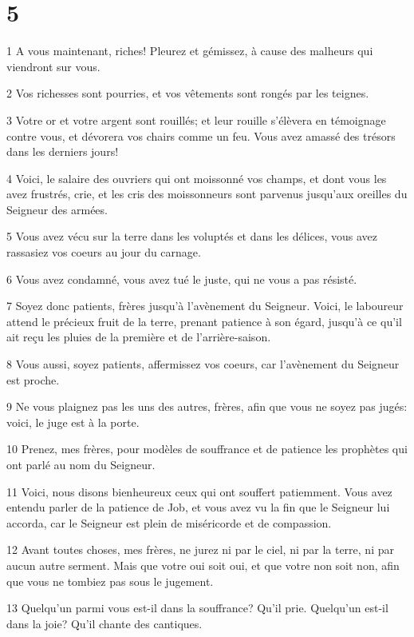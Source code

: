 \chapter{5}

\par 1 A vous maintenant, riches! Pleurez et gémissez, à cause des malheurs qui viendront sur vous.
\par 2 Vos richesses sont pourries, et vos vêtements sont rongés par les teignes.
\par 3 Votre or et votre argent sont rouillés; et leur rouille s'élèvera en témoignage contre vous, et dévorera vos chairs comme un feu. Vous avez amassé des trésors dans les derniers jours!
\par 4 Voici, le salaire des ouvriers qui ont moissonné vos champs, et dont vous les avez frustrés, crie, et les cris des moissonneurs sont parvenus jusqu'aux oreilles du Seigneur des armées.
\par 5 Vous avez vécu sur la terre dans les voluptés et dans les délices, vous avez rassasiez vos coeurs au jour du carnage.
\par 6 Vous avez condamné, vous avez tué le juste, qui ne vous a pas résisté.
\par 7 Soyez donc patients, frères jusqu'à l'avènement du Seigneur. Voici, le laboureur attend le précieux fruit de la terre, prenant patience à son égard, jusqu'à ce qu'il ait reçu les pluies de la première et de l'arrière-saison.
\par 8 Vous aussi, soyez patients, affermissez vos coeurs, car l'avènement du Seigneur est proche.
\par 9 Ne vous plaignez pas les uns des autres, frères, afin que vous ne soyez pas jugés: voici, le juge est à la porte.
\par 10 Prenez, mes frères, pour modèles de souffrance et de patience les prophètes qui ont parlé au nom du Seigneur.
\par 11 Voici, nous disons bienheureux ceux qui ont souffert patiemment. Vous avez entendu parler de la patience de Job, et vous avez vu la fin que le Seigneur lui accorda, car le Seigneur est plein de miséricorde et de compassion.
\par 12 Avant toutes choses, mes frères, ne jurez ni par le ciel, ni par la terre, ni par aucun autre serment. Mais que votre oui soit oui, et que votre non soit non, afin que vous ne tombiez pas sous le jugement.
\par 13 Quelqu'un parmi vous est-il dans la souffrance? Qu'il prie. Quelqu'un est-il dans la joie? Qu'il chante des cantiques.
